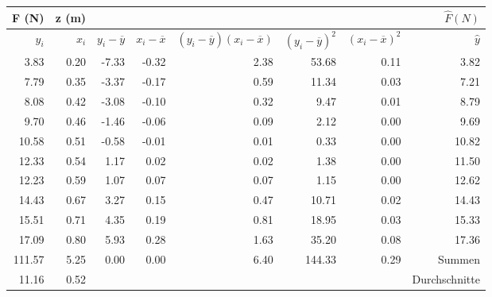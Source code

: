 \begin{tabular}{rrrrrrrr}
    \toprule
                F (N)&z (m)&&&&&& $\hat{F}(N)$ \\
    \midrule
             $y_i$      & $x_i$      &  $y_i-\overline{y}$ & $x_i-\overline{x} $ & $(y_i-\overline{y})(x_i-\overline{x})$ & $(y_i-\overline{y})^2$ & $(x_i-\overline{x})^2$ & $ \hat{y}  $ \\
    \midrule
               3.83&        0.20&              -7.33  &              -0.32  &                 2.38                   &        53.68           &         0.11           &  3.82 \\
               7.79&        0.35&              -3.37  &              -0.17  &                 0.59                   &        11.34           &         0.03           &  7.21 \\
               8.08&        0.42&              -3.08  &              -0.10  &                 0.32                   &         9.47           &         0.01           &  8.79 \\
               9.70&        0.46&              -1.46  &              -0.06  &                 0.09                   &         2.12           &         0.00           &  9.69 \\
              10.58&        0.51&              -0.58  &              -0.01  &                 0.01                   &         0.33           &         0.00           &  10.82 \\
              12.33&        0.54&               1.17  &               0.02  &                 0.02                   &         1.38           &         0.00           &  11.50 \\
              12.23&        0.59&               1.07  &               0.07  &                 0.07                   &         1.15           &         0.00           &  12.62 \\
              14.43&        0.67&               3.27  &               0.15  &                 0.47                   &        10.71           &         0.02           &  14.43 \\
              15.51&        0.71&               4.35  &               0.19  &                 0.81                   &        18.95           &         0.03           &  15.33 \\
              17.09&        0.80&               5.93  &               0.28  &                 1.63                   &        35.20           &         0.08           &  17.36 \\
    \midrule
             111.57&        5.25&               0.00  &               0.00  &                 6.40                   &       144.33           &         0.29           & Summen \\
    \midrule
              11.16&        0.52&&&&&& Durchschnitte \\
    \bottomrule
\end{tabular}

